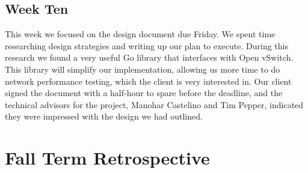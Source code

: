 \documentclass[10pt,onecolumn,journal,draftclsnofoot]{IEEEtran}
\begin{document}
\subsection{Week Ten}

This week we focused on the design document due Friday. We spent time
researching design strategies and writing up our plan to execute. During this
research we found a very useful Go library that interfaces with Open vSwitch.
This library will simplify our implementation, allowing us more time to do
network performance testing, which the client is very interested in. Our client
signed the document with a half-hour to spare before the deadline, and the
technical advisors for the project, Manohar Castelino and Tim Pepper, indicated
they were impressed with the design we had outlined.

\section{Fall Term Retrospective}
\end{document}
